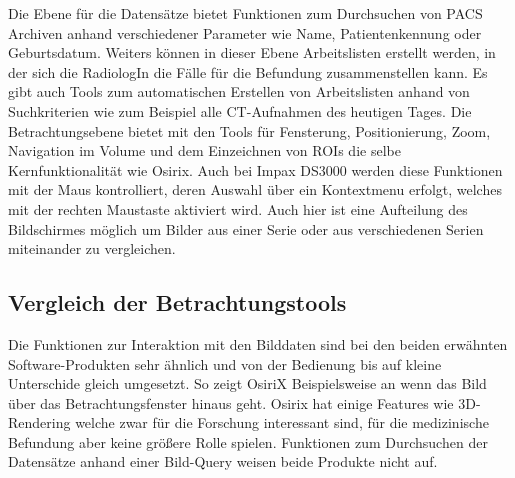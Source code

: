 %
Die Ebene für die Datensätze bietet Funktionen zum Durchsuchen von PACS Archiven anhand verschiedener Parameter wie Name, Patientenkennung oder Geburtsdatum.
Weiters können in dieser Ebene Arbeitslisten erstellt werden, in der sich die RadiologIn die Fälle für die Befundung zusammenstellen kann.
Es gibt auch Tools zum automatischen Erstellen von Arbeitslisten anhand von Suchkriterien wie zum Beispiel alle CT-Aufnahmen des heutigen Tages.
%
Die Betrachtungsebene bietet mit den Tools für Fensterung, Positionierung, Zoom, Navigation im Volume und dem Einzeichnen von ROIs die selbe Kernfunktionalität wie Osirix.
Auch bei Impax DS3000 werden diese Funktionen mit der Maus kontrolliert, deren Auswahl über ein Kontextmenu erfolgt, welches mit der rechten Maustaste aktiviert wird.
Auch hier ist eine Aufteilung des Bildschirmes möglich um Bilder aus einer Serie oder aus verschiedenen Serien miteinander zu vergleichen.


\subsection{Vergleich der Betrachtungstools}
\label{sec:Vergleich der Betrachtungstools}
Die Funktionen zur Interaktion mit den Bilddaten sind bei den beiden erwähnten Software-Produkten sehr ähnlich und von der Bedienung bis auf kleine Unterschide gleich umgesetzt.
So zeigt OsiriX Beispielsweise an wenn das Bild über das Betrachtungsfenster hinaus geht.
Osirix hat einige Features wie 3D-Rendering welche zwar für die Forschung interessant sind, für die medizinische Befundung aber keine größere Rolle spielen.
Funktionen zum Durchsuchen der Datensätze anhand einer Bild-Query weisen beide Produkte nicht auf.



